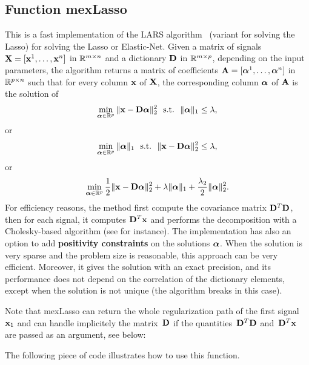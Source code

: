 \documentclass[a4paper, 11pt]{article}
\begin{document}
\subsection{Function mexLasso}
This is a fast implementation of the LARS algorithm~\cite{efron} (variant for solving the Lasso) for solving the Lasso or Elastic-Net. Given a matrix of signals ${\mathbf X}=[{\mathbf x}^1,\ldots,{\mathbf x}^n]$  in ${\mathbb R}^{m \times n}$ and a dictionary ${\mathbf D}$ in ${\mathbb R}^{m \times p}$, depending on the input parameters, the algorithm returns a matrix of coefficients ${\mathbf A}=[{\boldsymbol\alpha}^1,\ldots,{\boldsymbol\alpha}^n]$ in ${\mathbb R}^{p \times n}$ such that for every column ${\mathbf x}$ of ${\mathbf X}$, the corresponding column ${\boldsymbol\alpha}$ of ${\mathbf A}$ is the solution of
\begin{equation}
\min_{{\boldsymbol\alpha} \in {\mathbb R}^p} \|{\mathbf x}-{\mathbf D}{\boldsymbol\alpha}\|_2^2 ~~\text{s.t.}~~ \|{\boldsymbol\alpha}\|_1 \leq \lambda,
   \end{equation}
   or
   \begin{equation}
   \min_{{\boldsymbol\alpha} \in {\mathbb R}^p}  \|{\boldsymbol\alpha}\|_1 ~~\text{s.t.}~~ \|{\mathbf x}-{\mathbf D}{\boldsymbol\alpha}\|_2^2 \leq \lambda, \label{eq:lasso2}
   \end{equation}
   or
   \begin{equation}
   \min_{{\boldsymbol\alpha} \in {\mathbb R}^p} \frac{1}{2}\|{\mathbf x}-{\mathbf D}{\boldsymbol\alpha}\|_2^2 + \lambda \|{\boldsymbol\alpha}\|_1 + \frac{\lambda_2}{2}\|{\boldsymbol\alpha}\|_2^2. \label{eq:lasso}
   \end{equation}
   For efficiency reasons, the method first compute the covariance matrix ${\mathbf D}^T{\mathbf D}$, then
   for each signal, it computes ${\mathbf D}^T{\mathbf x}$ and performs the decomposition with a
   Cholesky-based algorithm (see \cite{efron} for instance).  The implementation
   has also an option to add {\bf positivity constraints} on the solutions
   ${\boldsymbol\alpha}$.  When the solution is very sparse and the problem size is
   reasonable, this approach can be very efficient. Moreover, it gives the
   solution with an exact precision, and its performance does not depend on the
   correlation of the dictionary elements, except when the solution is not unique
   (the algorithm breaks in this case).

   Note that mexLasso can return the whole regularization path of the first signal ${\mathbf x}_1$
   and can handle implicitely the matrix~${\mathbf D}$ if the quantities~${\mathbf D}^T{\mathbf D}$ and~${\mathbf D}^T{\mathbf x}$ are passed
   as an argument, see below:


The following piece of code illustrates how to use this function.

\end{document}

